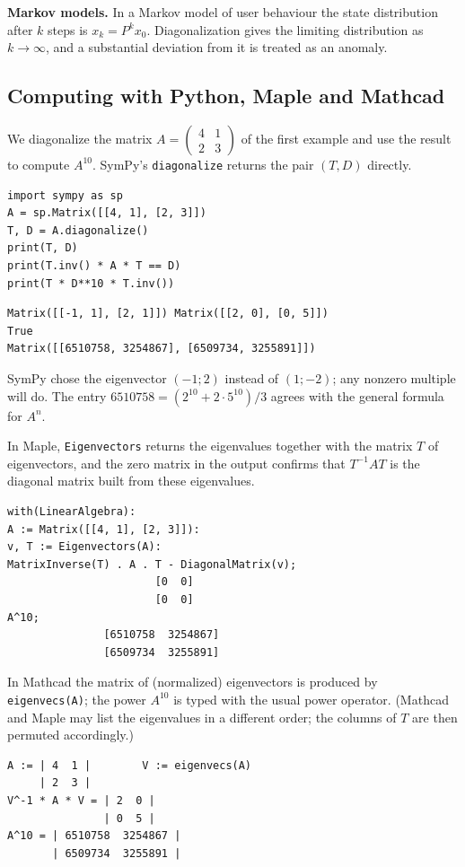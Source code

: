 \textbf{Markov models.} In a Markov model of user behaviour the state
distribution after $k$ steps is $x_{k}=P^kx_0$. Diagonalization gives the
limiting distribution as $k\to\infty$, and a substantial deviation from
it is treated as an anomaly.

\subsection{Computing with Python, Maple and Mathcad}

We diagonalize the matrix $A=\begin{pmatrix}4&1\\2&3\end{pmatrix}$ of the
first example and use the result to compute $A^{10}$. SymPy’s
\texttt{diagonalize} returns the pair $(T,D)$ directly.
\begin{Verbatim}[fontsize=\footnotesize,frame=single,label={\small Python}]
import sympy as sp
A = sp.Matrix([[4, 1], [2, 3]])
T, D = A.diagonalize()
print(T, D)
print(T.inv() * A * T == D)
print(T * D**10 * T.inv())
\end{Verbatim}
\begin{Verbatim}[fontsize=\footnotesize,frame=single,label={\small Output}]
Matrix([[-1, 1], [2, 1]]) Matrix([[2, 0], [0, 5]])
True
Matrix([[6510758, 3254867], [6509734, 3255891]])
\end{Verbatim}
SymPy chose the eigenvector $(-1;2)$ instead of $(1;-2)$; any nonzero
multiple will do. The entry $6510758=(2^{10}+2\cdot5^{10})/3$ agrees with
the general formula for $A^n$.

In Maple, \texttt{Eigenvectors} returns the eigenvalues together with the
matrix $T$ of eigenvectors, and the zero matrix in the output confirms
that $T^{-1}AT$ is the diagonal matrix built from these eigenvalues.
\begin{Verbatim}[fontsize=\footnotesize,frame=single,label={\small Maple}]
with(LinearAlgebra):
A := Matrix([[4, 1], [2, 3]]):
v, T := Eigenvectors(A):
MatrixInverse(T) . A . T - DiagonalMatrix(v);
                       [0  0]
                       [0  0]
A^10;
               [6510758  3254867]
               [6509734  3255891]
\end{Verbatim}

In Mathcad the matrix of (normalized) eigenvectors is produced by
\texttt{eigenvecs(A)}; the power $A^{10}$ is typed with the usual power
operator. (Mathcad and Maple may list the eigenvalues in a different
order; the columns of $T$ are then permuted accordingly.)
\begin{Verbatim}[fontsize=\footnotesize,frame=single,label={\small Mathcad}]
A := | 4  1 |        V := eigenvecs(A)
     | 2  3 |
V^-1 * A * V = | 2  0 |
               | 0  5 |
A^10 = | 6510758  3254867 |
       | 6509734  3255891 |
\end{Verbatim}

